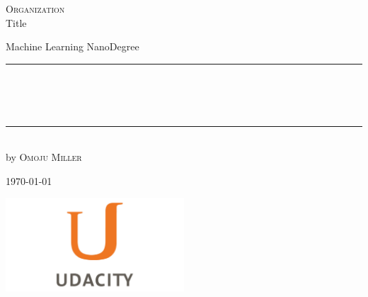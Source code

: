 
\begin{titlepage}
    \begin{addmargin}[-1cm]{-3cm}
    \begin{center}
        \large
        {\Large \textsc{Organization}}\\[1ex]
        Title\\
       

        \vfill

        Machine Learning NanoDegree\\ \vskip1cm
        \rule{14cm}{0.4pt}\\ \bigskip
        \begingroup
            \Large
            \color{Maroon}\spacedallcaps{\myTitle} \\ \bigskip
        \endgroup
        \spacedlowsmallcaps{\mySubtitle} \\ \bigskip
        \rule{14cm}{0.4pt}\\ \vskip1cm
        by \textsc{Omoju Miller}

        \vfill
        \vfill
        \vfill

       
        \hfill \today
    \end{center}
    \vspace{-3.5cm}
    \includegraphics[width=0.50\textwidth]{figures/udacityLogo}
  \end{addmargin}
\end{titlepage}
